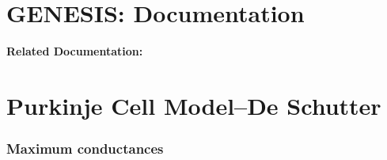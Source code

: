 \documentclass[12pt]{article}
\begin{document}
\section*{GENESIS: Documentation}

{\bf Related Documentation:}

\section*{Purkinje Cell Model--De Schutter}

\subsubsection*{Maximum conductances}
\end{document}
